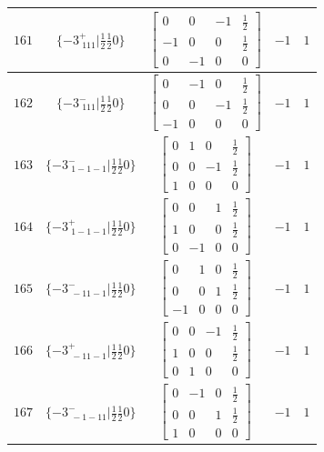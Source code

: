 \documentclass[fleqn,8pt]{jsarticle}
\begin{document}
\begin{longtable}{ccccc}
$ 161 $ & $ \{-3^{+}_{\,\,111}|\frac{1}{2} \frac{1}{2} 0\} $ & $ \begin{bmatrix} 0 & 0 & -1 & \frac{1}{2} \\ -1 & 0 & 0 & \frac{1}{2} \\ 0 & -1 & 0 & 0 \end{bmatrix} $ & $ -1 $ & $ 1 $ \\ \hline
$ 162 $ & $ \{-3^{-}_{\,\,111}|\frac{1}{2} \frac{1}{2} 0\} $ & $ \begin{bmatrix} 0 & -1 & 0 & \frac{1}{2} \\ 0 & 0 & -1 & \frac{1}{2} \\ -1 & 0 & 0 & 0 \end{bmatrix} $ & $ -1 $ & $ 1 $ \\ \hline
$ 163 $ & $ \{-3^{-}_{\,\,1-1-1}|\frac{1}{2} \frac{1}{2} 0\} $ & $ \begin{bmatrix} 0 & 1 & 0 & \frac{1}{2} \\ 0 & 0 & -1 & \frac{1}{2} \\ 1 & 0 & 0 & 0 \end{bmatrix} $ & $ -1 $ & $ 1 $ \\ \hline
$ 164 $ & $ \{-3^{+}_{\,\,1-1-1}|\frac{1}{2} \frac{1}{2} 0\} $ & $ \begin{bmatrix} 0 & 0 & 1 & \frac{1}{2} \\ 1 & 0 & 0 & \frac{1}{2} \\ 0 & -1 & 0 & 0 \end{bmatrix} $ & $ -1 $ & $ 1 $ \\ \hline
$ 165 $ & $ \{-3^{-}_{\,\,-11-1}|\frac{1}{2} \frac{1}{2} 0\} $ & $ \begin{bmatrix} 0 & 1 & 0 & \frac{1}{2} \\ 0 & 0 & 1 & \frac{1}{2} \\ -1 & 0 & 0 & 0 \end{bmatrix} $ & $ -1 $ & $ 1 $ \\ \hline
$ 166 $ & $ \{-3^{+}_{\,\,-11-1}|\frac{1}{2} \frac{1}{2} 0\} $ & $ \begin{bmatrix} 0 & 0 & -1 & \frac{1}{2} \\ 1 & 0 & 0 & \frac{1}{2} \\ 0 & 1 & 0 & 0 \end{bmatrix} $ & $ -1 $ & $ 1 $ \\ \hline
$ 167 $ & $ \{-3^{-}_{\,\,-1-11}|\frac{1}{2} \frac{1}{2} 0\} $ & $ \begin{bmatrix} 0 & -1 & 0 & \frac{1}{2} \\ 0 & 0 & 1 & \frac{1}{2} \\ 1 & 0 & 0 & 0 \end{bmatrix} $ & $ -1 $ & $ 1 $ \\ \hline

\end{longtable}
\end{document}
